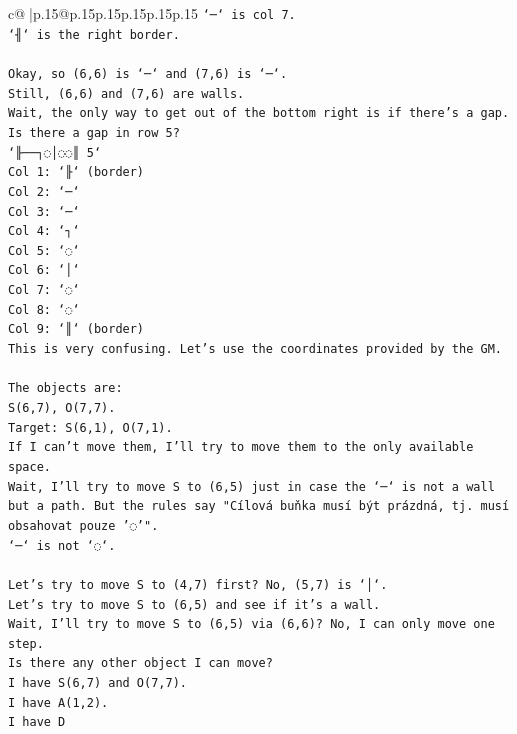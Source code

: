 \documentclass{article}
\begin{document}
{\begin{supertabular}{c@{$\;$}|p{.15\linewidth}@{}p{.15\linewidth}p{.15\linewidth}p{.15\linewidth}p{.15\linewidth}p{.15\linewidth}}
{{{\texttt{`─` is col 7.} \\
\texttt{`╢` is the right border.} \\
\\ 
\texttt{Okay, so (6,6) is `─` and (7,6) is `─`.} \\
\texttt{Still, (6,6) and (7,6) are walls.} \\
\texttt{Wait, the only way to get out of the bottom right is if there's a gap.} \\
\texttt{Is there a gap in row 5?} \\
\texttt{`╟──┐◌│◌◌║ 5`} \\
\texttt{Col 1: `╟` (border)} \\
\texttt{Col 2: `─`} \\
\texttt{Col 3: `─`} \\
\texttt{Col 4: `┐`} \\
\texttt{Col 5: `◌`} \\
\texttt{Col 6: `│`} \\
\texttt{Col 7: `◌`} \\
\texttt{Col 8: `◌`} \\
\texttt{Col 9: `║` (border)} \\
\texttt{This is very confusing. Let's use the coordinates provided by the GM.} \\
\\ 
\texttt{The objects are:} \\
\texttt{S(6,7), O(7,7).} \\
\texttt{Target: S(6,1), O(7,1).} \\
\texttt{If I can't move them, I'll try to move them to the only available space.} \\
\texttt{Wait, I'll try to move S to (6,5) just in case the `─` is not a wall but a path. But the rules say "Cílová buňka musí být prázdná, tj. musí obsahovat pouze '◌'".} \\
\texttt{`─` is not `◌`.} \\
\\ 
\texttt{Let's try to move S to (4,7) first? No, (5,7) is `│`.} \\
\texttt{Let's try to move S to (6,5) and see if it's a wall.} \\
\texttt{Wait, I'll try to move S to (6,5) via (6,6)? No, I can only move one step.} \\
\texttt{Is there any other object I can move?} \\
\texttt{I have S(6,7) and O(7,7).} \\
\texttt{I have A(1,2).} \\
\texttt{I have D} \\
            }
        }
    }
     \\ \\


\end{supertabular}}
\end{document}
